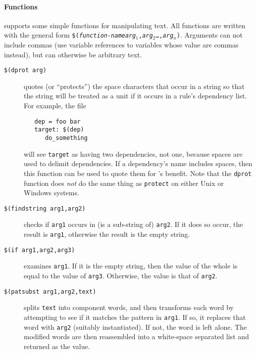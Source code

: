 \paragraph{Functions}
\holmake{} supports some simple functions for manipulating text.  All
functions are written with the general form
\texttt{\$(\textsl{function-name}\textvisiblespace{}\hspace{1mm}\textsl{arg}${}_1$,\textsl{arg}${}_2$\dots,\textsl{arg}${}_n$)}.
Arguments can not include commas (use variable references to variables
whose value are commas instead), but can otherwise be arbitrary text.
\begin{description}
\item[\texttt{\$(dprot arg)}] quotes (or ``protects'') the space
  characters that occur in a string so that the string will be treated
  as a unit if it occurs in a rule's dependency list.  For example,
  the file
\begin{verbatim}
   dep = foo bar
   target: $(dep)
      do_something
\end{verbatim}
  will see \texttt{target} as having two dependencies, not one,
  because spaces are used to delimit dependencies.  If a dependency's
  name includes spaces, then this function can be used to quote them
  for \holmake's benefit.  Note that the \texttt{dprot} function
  does \emph{not} do the same thing as \texttt{protect} on either Unix
  or Windows systems.
\item[\texttt{\$(findstring arg1,arg2)}] checks if \texttt{arg1} occurs
  in (is a sub-string of) \texttt{arg2}.  If it does so occur, the
  result is \texttt{arg1}, otherwise the result is the empty string.
\item[\texttt{\$(if arg1,arg2,arg3)}] examines \texttt{arg1}.  If it
  is the empty string, then the value of the whole is equal to the
  value of \texttt{arg3}.  Otherwise, the value is that of \texttt{arg2}.
\item[\texttt{\$(patsubst arg1,arg2,text)}] splits \texttt{text} into component
  words, and then transforms each word by attempting to see if it
  matches the pattern in \texttt{arg1}.  If so, it replaces that word
  with \texttt{arg2} (suitably instantiated).  If not, the word is
  left alone.  The modified words are then reassembled into a
  white-space separated list and returned as the value.


\end{description}

